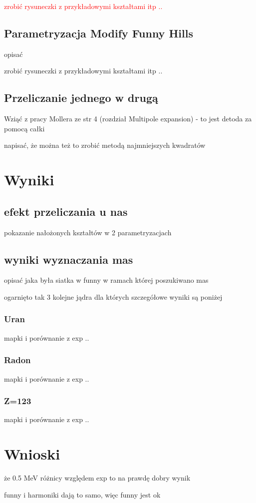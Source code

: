 \documentclass[polish]{article}
\numberwithin{equation}{section}
\begin{document}
\bigskip
\textcolor{red}{zrobić rysuneczki z przykładowymi kształtami itp ..}


\subsection{Parametryzacja Modify Funny Hills}

opisać

zrobić rysuneczki z przykładowymi kształtami itp ..

\subsection{Przeliczanie jednego w drugą}

Wziąć z pracy Mollera ze str 4 (rozdział Multipole expansion) - to jest detoda za pomocą całki

napisać, że można też to zrobić metodą najmniejszych kwadratów

\section{Wyniki}

\subsection{efekt przeliczania u nas}

pokazanie nałożonych kształtów w 2 parametryzacjach

\subsection{wyniki wyznaczania mas}

opisać jaka była siatka w funny w ramach której poszukiwano mas

ogarnięto tak 3 kolejne jądra dla których szczegółowe wyniki są poniżej

\subsubsection{Uran}
mapki i porównanie z exp .. 

\subsubsection{Radon}
mapki i porównanie z exp .. 

\subsubsection{Z=123}
mapki i porównanie z exp .. 


\section{Wnioski}

że 0.5 MeV różnicy względem exp to na prawdę dobry wynik

funny i harmoniki dają to samo, więc funny jest ok
\end{document}

